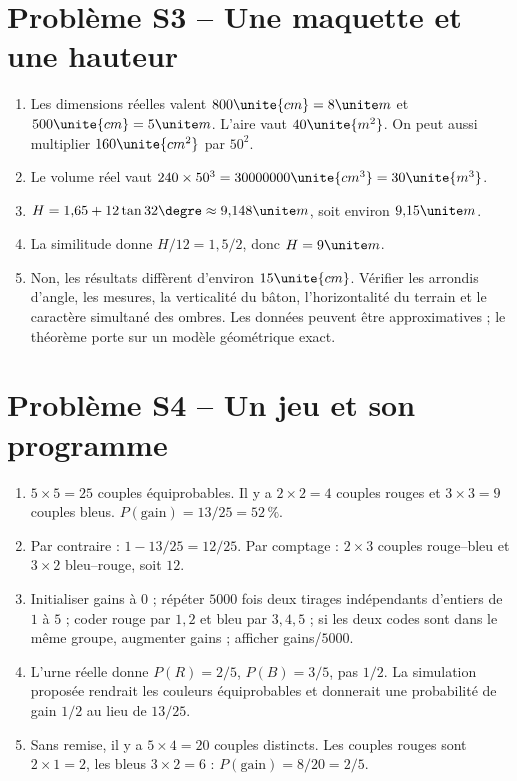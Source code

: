 \section*{Problème S3 -- Une maquette et une hauteur}

\begin{enumerate}
\item Les dimensions réelles valent $800\unite{cm}=8\unite m$ et $500\unite{cm}=5\unite m$. L'aire vaut $40\unite{m^2}$. On peut aussi multiplier $160\unite{cm^2}$ par $50^2$.
\item Le volume réel vaut $240\times50^3=30000000\unite{cm^3}=30\unite{m^3}$.
\item $H=1{,}65+12\tan32\degre\approx9{,}148\unite m$, soit environ $9{,}15\unite m$.
\item La similitude donne $H/12=1{,}5/2$, donc $H=9\unite m$.
\item Non, les résultats diffèrent d'environ $15\unite{cm}$. Vérifier les arrondis d'angle, les mesures, la verticalité du bâton, l'horizontalité du terrain et le caractère simultané des ombres. Les données peuvent être approximatives ; le théorème porte sur un modèle géométrique exact.
\end{enumerate}

\section*{Problème S4 -- Un jeu et son programme}

\begin{enumerate}
\item $5\times5=25$ couples équiprobables. Il y a $2\times2=4$ couples rouges et $3\times3=9$ couples bleus. $P(\text{gain})=13/25=52\,\%$.
\item Par contraire : $1-13/25=12/25$. Par comptage : $2\times3$ couples rouge--bleu et $3\times2$ bleu--rouge, soit $12$.
\item Initialiser gains à $0$ ; répéter $5000$ fois deux tirages indépendants d'entiers de $1$ à $5$ ; coder rouge par $1,2$ et bleu par $3,4,5$ ; si les deux codes sont dans le même groupe, augmenter gains ; afficher gains/$5000$.
\item L'urne réelle donne $P(R)=2/5$, $P(B)=3/5$, pas $1/2$. La simulation proposée rendrait les couleurs équiprobables et donnerait une probabilité de gain $1/2$ au lieu de $13/25$.
\item Sans remise, il y a $5\times4=20$ couples distincts. Les couples rouges sont $2\times1=2$, les bleus $3\times2=6$ : $P(\text{gain})=8/20=2/5$.
\end{enumerate}